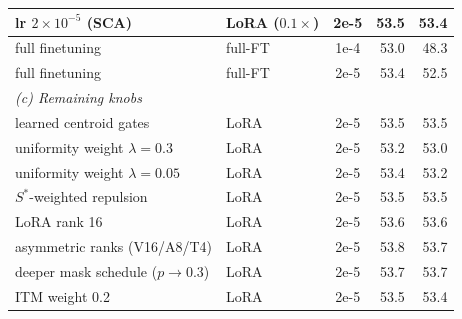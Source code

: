 \begin{table}[t]
\begin{tabular}{llcrr}
\quad lr $2\!\times\!10^{-5}$ (SCA) & LoRA ($0.1\times$) & 2e-5 & 53.5 & 53.4 \\
\midrule
full finetuning & full-FT & 1e-4 & 53.0 & 48.3 \\
full finetuning & full-FT & 2e-5 & 53.4 & 52.5 \\
\midrule
\multicolumn{5}{l}{\emph{(c) Remaining knobs}} \\
learned centroid gates & LoRA & 2e-5 & 53.5 & 53.5 \\
uniformity weight $\lambda\!=\!0.3$ & LoRA & 2e-5 & 53.2 & 53.0 \\
uniformity weight $\lambda\!=\!0.05$ & LoRA & 2e-5 & 53.4 & 53.2 \\
$S^{*}$-weighted repulsion & LoRA & 2e-5 & 53.5 & 53.5 \\
LoRA rank 16 & LoRA & 2e-5 & 53.6 & 53.6 \\
asymmetric ranks (V16/A8/T4) & LoRA & 2e-5 & 53.8 & 53.7 \\
deeper mask schedule ($p\!\to\!0.3$) & LoRA & 2e-5 & 53.7 & 53.7 \\
ITM weight 0.2 & LoRA & 2e-5 & 53.5 & 53.4 \\
\bottomrule
\end{tabular}
\end{table}
